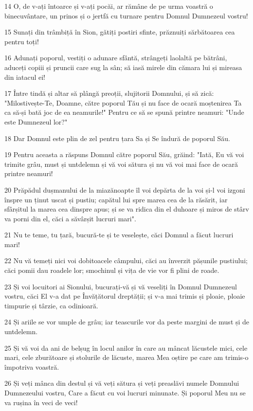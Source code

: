 \par 14 O, de v-ați întoarce și v-ați pocăi, ar rămâne de pe urma voastră o binecuvântare, un prinos și o jertfă cu turnare pentru Domnul Dumnezeul vostru!
\par 15 Sunați din trâmbiță în Sion, gătiți postiri sfinte, prăznuiți sărbătoarea cea pentru toți!
\par 16 Adunați poporul, vestiți o adunare sfântă, strângeți laolaltă pe bătrâni, aduceți copiii și pruncii care sug la sân; să iasă mirele din cămara lui și mireasa din iatacul ei!
\par 17 Între tindă și altar să plângă preoții, slujitorii Domnului, și să zică: "Milostivește-Te, Doamne, către poporul Tău și nu face de ocară moștenirea Ta ca să-și bată joc de ea neamurile!" Pentru ce să se spună printre neamuri: "Unde este Dumnezeul lor?"
\par 18 Dar Domnul este plin de zel pentru țara Sa și Se îndură de poporul Său.
\par 19 Pentru aceasta a răspuns Domnul către poporul Său, grăind: "Iată, Eu vă voi trimite grâu, must și untdelemn și vă voi sătura și nu vă voi mai face de ocară printre neamuri!
\par 20 Prăpădul dușmanului de la miazănoapte îl voi depărta de la voi și-l voi izgoni înspre un ținut uscat și pustiu; capătul lui spre marea cea de la răsărit, iar sfârșitul la marea cea dinspre apus; și se va ridica din el duhoare și miros de stârv va porni din el, căci a săvârșit lucruri mari".
\par 21 Nu te teme, tu țară, bucură-te și te veselește, căci Domnul a făcut lucruri mari!
\par 22 Nu vă temeți nici voi dobitoacele câmpului, căci au înverzit pășunile pustiului; căci pomii dau roadele lor; smochinul și vița de vie vor fi plini de roade.
\par 23 Și voi locuitori ai Sionului, bucurați-vă și vă veseliți în Domnul Dumnezeul vostru, căci El v-a dat pe Învățătorul dreptății; și v-a mai trimis și ploaie, ploaie timpurie și târzie, ca odinioară.
\par 24 Și ariile se vor umple de grâu; iar teascurile vor da peste margini de must și de untdelemn.
\par 25 Și vă voi da ani de belșug în locul anilor în care au mâncat lăcustele mici, cele mari, cele zburătoare și stolurile de lăcuste, marea Mea oștire pe care am trimis-o împotriva voastră.
\par 26 Și veți mânca din destul și vă veți sătura și veți preaslăvi numele Domnului Dumnezeului vostru, Care a făcut cu voi lucruri minunate. Și poporul Meu nu se va rușina în veci de veci!
